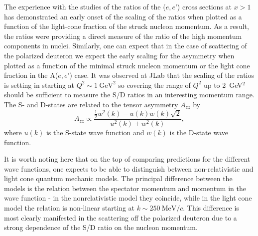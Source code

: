 The experience with the studies of the ratios of the ($e,e’$) cross sections at $x>1$ has demonstrated an early onset of the scaling of the ratios when plotted as a function of the light-cone fraction of the struck nucleon momentum.  As a result, the ratios were providing a direct measure of the ratio of the high momentum components in nuclei.  Similarly, one can expect that in the case of scattering of the polarized deuteron we expect the early scaling for the asymmetry when plotted as a function of the minimal struck nucleon momentum or the light cone fraction in the A($e,e’$) case.
It was observed at JLab that the scaling of the ratios is setting in starting at $Q^2 \sim 1 \mathrm{~GeV}^2$ so covering the range of $Q^2$ up to 2~GeV$^2$ should be sufficient to  measure the S/D ratios in an interesting momentum range. The S- and D-states are related to the tensor asymmetry $A_{zz}$ by~\cite{Frankfurt:1988nt}
\begin{equation}
	A_{zz} \propto \frac{\frac{1}{2}w^2(k)-u(k)w(k)\sqrt{2}}{u^2(k)+w^2(k)},
\end{equation}
where $u(k)$ is the S-state wave function and $w(k)$ is the D-state wave function.



It is worth noting here that on the top of comparing predictions for the different wave functions, one expects to be able to distinguish between non-relativistic and light cone quantum mechanic models.  The principal difference between the models is the relation between the spectator momentum and momentum in the wave function - in the nonrelativistic model they coincide, while in the light cone model the relation is non-linear starting at $k \sim 250 \mathrm{~MeV}/c$. This difference is most clearly manifested in the scattering off the polarized deuteron due to a strong dependence of the S/D ratio on the nucleon momentum.